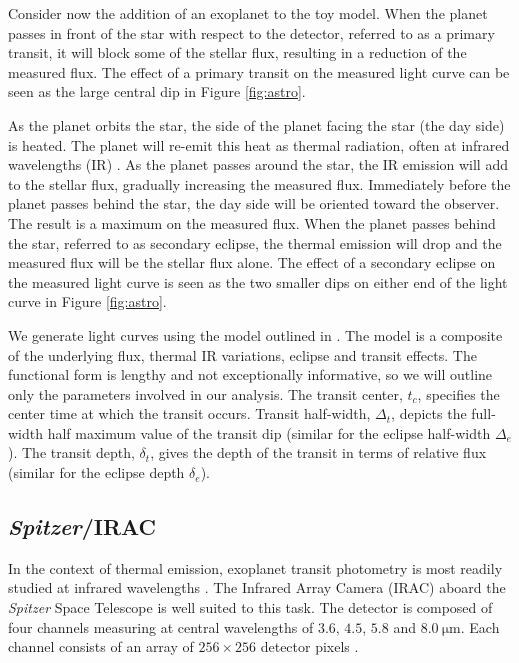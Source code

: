 \documentclass[twocolumn]{aastex61}
\begin{document}
Consider now the addition of an exoplanet to the toy model. When the planet passes in front of the star with respect to the detector, referred to as a primary transit, it will block some of the stellar flux, resulting in a reduction of the measured flux. The effect of a primary transit on the measured light curve can be seen as the large central dip in Figure \ref{fig:astro}.

As the planet orbits the star, the side of the planet facing the star (the day side) is heated. The planet will re-emit this heat as thermal radiation, often at infrared wavelengths (IR) \citep{ingalls2016}. As the planet passes around the star, the IR emission will add to the stellar flux, gradually increasing the measured flux. Immediately before the planet passes behind the star, the day side will be oriented toward the observer. The result is a maximum on the measured flux. When the planet passes behind the star, referred to as secondary eclipse, the thermal emission will drop and the measured flux will be the stellar flux alone. The effect of a secondary eclipse on the measured light curve is seen as the two smaller dips on either end of the light curve in Figure \ref{fig:astro}.

We generate light curves using the model outlined in \citet{schwartz2016}. The model is a composite of the underlying flux, thermal IR variations, eclipse and transit effects. The functional form is lengthy and not exceptionally informative, so we will outline only the parameters involved in our analysis. The transit center, $t_c$, specifies the center time at which the transit occurs. Transit half-width, $\Delta_{t}$, depicts the full-width half maximum value of the transit dip (similar for the eclipse half-width $\Delta_{e}$). The transit depth, $\delta_{t}$, gives the depth of the transit in terms of relative flux (similar for the eclipse depth $\delta_{e}$).

\subsection{\textit{Spitzer}/IRAC}
\label{sec:irac}
In the context of thermal emission, exoplanet transit photometry is most readily studied at infrared wavelengths \citep{ingalls2016}. The Infrared Array Camera (IRAC) aboard the \textit{Spitzer} Space Telescope is well suited to this task. The detector is composed of four channels measuring at central wavelengths of $3.6$, $4.5$, $5.8$ and $8.0~\mathrm{\mu m}$. Each channel consists of an array of $256 \times 256$ detector pixels \citep{fazio2004}.
\end{document}
